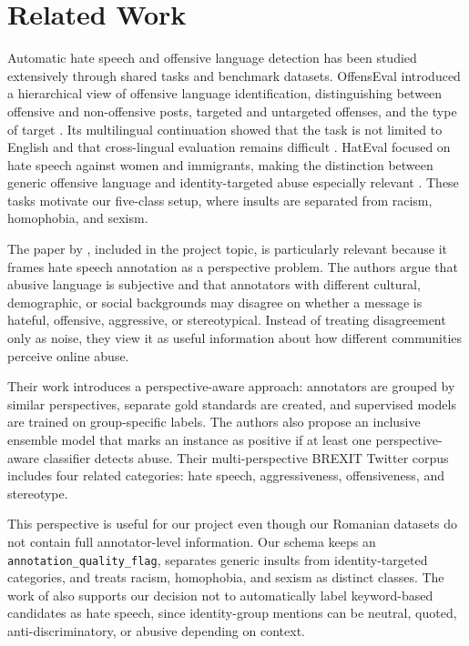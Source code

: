 \section{Related Work}
\label{sec:related_work}

Automatic hate speech and offensive language detection has been studied extensively through shared tasks and benchmark datasets. OffensEval introduced a hierarchical view of offensive language identification, distinguishing between offensive and non-offensive posts, targeted and untargeted offenses, and the type of target \citep{zampieri2019offenseval}. Its multilingual continuation showed that the task is not limited to English and that cross-lingual evaluation remains difficult \citep{zampieri2020offenseval}. HatEval focused on hate speech against women and immigrants, making the distinction between generic offensive language and identity-targeted abuse especially relevant \citep{basile2019hateval}. These tasks motivate our five-class setup, where insults are separated from racism, homophobia, and sexism.

The paper by \citet{akhtar2021whose}, included in the project topic, is particularly relevant because it frames hate speech annotation as a perspective problem. The authors argue that abusive language is subjective and that annotators with different cultural, demographic, or social backgrounds may disagree on whether a message is hateful, offensive, aggressive, or stereotypical. Instead of treating disagreement only as noise, they view it as useful information about how different communities perceive online abuse.

Their work introduces a perspective-aware approach: annotators are grouped by similar perspectives, separate gold standards are created, and supervised models are trained on group-specific labels. The authors also propose an inclusive ensemble model that marks an instance as positive if at least one perspective-aware classifier detects abuse. Their multi-perspective BREXIT Twitter corpus includes four related categories: hate speech, aggressiveness, offensiveness, and stereotype.

This perspective is useful for our project even though our Romanian datasets do not contain full annotator-level information. Our schema keeps an \texttt{annotation\_quality\_flag}, separates generic insults from identity-targeted categories, and treats racism, homophobia, and sexism as distinct classes. The work of \citet{akhtar2021whose} also supports our decision not to automatically label keyword-based candidates as hate speech, since identity-group mentions can be neutral, quoted, anti-discriminatory, or abusive depending on context.
